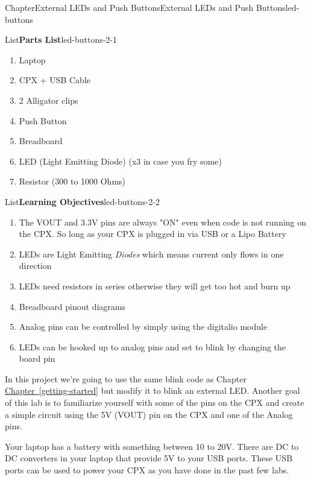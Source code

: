 \documentclass[oneside,10pt,]{book}
\newcommand{\xreffont}{\relax}
\newcommand{\linkhilite}[1]{\underline{#1}}
\numberwithin{equation}{section}
\begin{document}
\typeout{************************************************}
%
\begin{chapterptx}{Chapter}{External LEDs and Push Buttons}{}{External LEDs and Push Buttons}{}{}{led-buttons}
\renewcommand*{\chaptername}{Chapter}
\begin{introduction}{}%
\begin{listptx}{List}{\textbf{Parts List}}{led-buttons-2-1}{}%
%
\begin{enumerate}
\item{}Laptop%
\item{}CPX + USB Cable%
\item{}2 Alligator clips%
\item{}Push Button%
\item{}Breadboard%
\item{}LED (Light Emitting Diode) (x3 in case you fry some)%
\item{}Resistor (300 to 1000 Ohms)%
\end{enumerate}
\end{listptx}%
\begin{listptx}{List}{\textbf{Learning Objectives}}{led-buttons-2-2}{}%
%
\begin{enumerate}
\item{}The VOUT and 3.3V pins are always "ON" even when code is not running on the CPX. So long as your CPX is plugged in via USB or a Lipo Battery%
\item{}LEDs are Light Emitting \emph{Diodes} which means current only flows in one direction%
\item{}LEDs need resistors in series otherwise they will get too hot and burn up%
\item{}Breadboard pinout diagrams%
\item{}Analog pins can be controlled by simply using the digitalio module%
\item{}LEDs can be hooked up to analog pins and set to blink by changing the board pin%
\end{enumerate}
\end{listptx}%
In this project we're going to use the same blink code as Chapter \hyperref[getting-started]{\linkhilite{Chapter~{\xreffont\ref{getting-started}}}} but modify it to blink an external LED. Another goal of this lab is to familiarize yourself with some of the pins on the CPX and create a simple circuit using the 5V (VOUT) pin on the CPX and one of the Analog pins.%
\par
Your laptop has a battery with something between 10 to 20V. There are DC to DC converters in your laptop that provide 5V to your USB ports. These USB ports can be used to power your CPX as you have done in the past few labs.%

\end{introduction}
\end{chapterptx}
\end{document}
